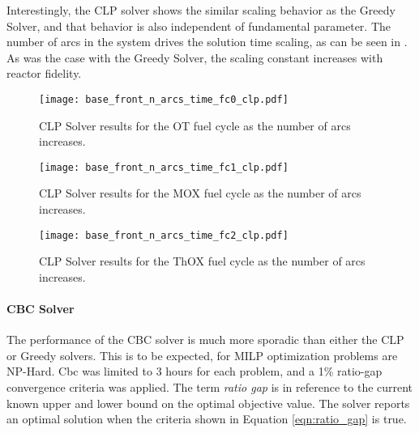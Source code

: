 Interestingly, the CLP solver shows the similar scaling behavior as the Greedy
Solver, and that behavior is also independent of fundamental parameter. The
number of arcs in the system drives the solution time scaling, as can be seen in
. As
was the case with the Greedy Solver, the scaling constant increases with reactor
fidelity.

\begin{figure}[h!]
  \begin{center}
    \texttt{[image: base\_front\_n\_arcs\_time\_fc0\_clp.pdf]}
    \caption[]{
      \label{fig:base_front_n_arcs_time_fc0_clp}
      CLP Solver results for the OT fuel cycle as the number of arcs
      increases.
      }
  \end{center}
\end{figure}

\begin{figure}[h!]
  \begin{center}
    \texttt{[image: base\_front\_n\_arcs\_time\_fc1\_clp.pdf]}
    \caption[]{
      \label{fig:base_front_n_arcs_time_fc1_clp}
      CLP Solver results for the MOX fuel cycle as the number of arcs
      increases.
      }
  \end{center}
\end{figure}

\begin{figure}[h!]
  \begin{center}
    \texttt{[image: base\_front\_n\_arcs\_time\_fc2\_clp.pdf]}
    \caption[]{
      \label{fig:base_front_n_arcs_time_fc2_clp}
      CLP Solver results for the ThOX fuel cycle as the number of arcs
      increases.
      }
  \end{center}
\end{figure}

\paragraph{CBC Solver}

The performance of the CBC solver is much more sporadic than either the CLP or
Greedy solvers. This is to be expected, for MILP optimization problems are
NP-Hard. Cbc was limited to 3 hours for each problem, and a 1\% ratio-gap
convergence criteria was applied. The term \textit{ratio gap} is in reference to
the current known upper and lower bound on the optimal objective value. The
solver reports an optimal solution when the criteria shown in Equation
\ref{eqn:ratio_gap} is true.

